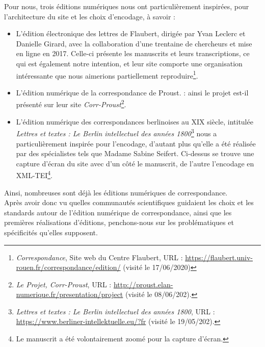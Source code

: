 Pour nous, trois éditions numériques nous ont particulièrement inspirées, pour l'architecture du site et les choix d'encodage, à savoir :
\begin{itemize}
    \item L'édition électronique des lettres de Flaubert, dirigée par Yvan Leclerc et Danielle Girard, avec la collaboration d'une trentaine de chercheurs et mise en ligne en 2017. Celle-ci présente les manuscrits et leurs transcriptions, ce qui est également notre intention, et leur site comporte une organisation intéressante que nous aimerions partiellement reproduire\footnote{\emph{Correspondance}, Site web du Centre Flaubert, URL : \url{https://flaubert.univ-rouen.fr/correspondance/edition/} (visité le 17/06/2020)}. 
    \item L'édition numérique de la correspondance de Proust.  : ainsi le projet est-il présenté sur leur site \emph{Corr-Proust}\footnote{\emph{Le Projet, Corr-Proust}, URL : \url{http://proust.elan-numerique.fr/presentation/project} (visité le 08/06/202).}.

    \item L'édition numérique des correspondances berlinoises au XIX siècle, intitulée \emph{Lettres et textes : Le Berlin intellectuel des années 1800}\footnote{\emph{Lettres et textes : Le Berlin intellectuel des années 1800}, URL : \url{https://www.berliner-intellektuelle.eu/?fr} (visité le 19/05/202).} nous a particulièrement inspirée pour l'encodage, d'autant plus qu'elle a été réalisée par des spécialistes tels que Madame Sabine Seifert. Ci-dessus se trouve une capture d'écran du site avec d'un côté le manuscrit, de l'autre l'encodage en XML-TEI\footnote{Le manuscrit a été volontairement zoomé pour la capture d'écran.}.
\end{itemize}

Ainsi, nombreuses sont déjà les éditions numériques de correspondance. \\

Après avoir donc vu quelles communautés scientifiques guidaient les choix et les standards autour de l'édition numérique de correspondance, ainsi que les premières réalisations d'éditions, penchons-nous sur les problématiques et spécificités qu'elles supposent.



